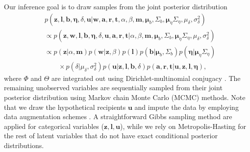 \documentclass[twoside]{article}
\begin{document}
Our inference goal is to draw samples from the joint posterior distribution
  \begin{equation*}
  \begin{aligned}
  &p(\boldsymbol{z},\boldsymbol{l},\boldsymbol{b}, \boldsymbol{\eta}, \delta,\boldsymbol{u}|\boldsymbol{w}, \boldsymbol{a}, \boldsymbol{r}, \boldsymbol{t}, \alpha, \beta, \boldsymbol{m}, \boldsymbol{\mu}_b, \Sigma_b, \boldsymbol{\mu}_\eta \Sigma_\eta, {\mu}_\delta,\sigma^2_\delta)\\
   &\propto p(\boldsymbol{z},\boldsymbol{w},\boldsymbol{l},\boldsymbol{b}, \boldsymbol{\eta}, \delta,\boldsymbol{u}, \boldsymbol{a}, \boldsymbol{r}, \boldsymbol{t}| \alpha, \beta, \boldsymbol{m}, \boldsymbol{\mu}_b, \Sigma_b, \boldsymbol{\mu}_\eta \Sigma_\eta, {\mu}_\delta,\sigma^2_\delta)\\
  & \propto p(\boldsymbol{z}|\alpha, \boldsymbol{m})p(\boldsymbol{w}|\boldsymbol{z}, \beta)p(\boldsymbol{l})p(\boldsymbol{b}|\boldsymbol{\mu}_b, \Sigma_b)p( \boldsymbol{\eta}|\boldsymbol{\mu}_\eta \Sigma_\eta)\\
  & \quad\quad\times p(\delta| {\mu}_\delta,\sigma^2_\delta)p(\boldsymbol{u}|\boldsymbol{z},\boldsymbol{l}, \boldsymbol{b}, \delta)p(\boldsymbol{a}, \boldsymbol{r}, \boldsymbol{t}|\boldsymbol{u},\boldsymbol{z},\boldsymbol{l}, \boldsymbol{\eta}),
  \end{aligned}
  \label{eqn:jointposterior}
  \end{equation*}
  where $\Phi$ and $\Theta$ are integrated out using Dirichlet-multinomial conjugacy \citep{griffiths2004finding}. The remaining unobserved variables are sequentially sampled from their joint posterior distribution using Markov chain Monte Carlo (MCMC) methods. Note that we draw the hypothetical recipients $\boldsymbol{u}$ and impute the data by employing data augmentation schemes \citep{tanner1987calculation}. A straightforward Gibbs sampling method are applied for categorical variables ($\boldsymbol{z},\boldsymbol{l},\boldsymbol{u}$), while we rely on Metropolis-Hasting for the rest of latent variables that do not have exact conditional posterior distributions.
  
\end{document}
